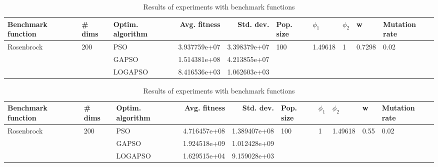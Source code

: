 \documentclass{article}
\begin{document}
\begin{table}
\centering
\caption{Results of experiments with benchmark functions}
\begin{tabular}{lllrrlllll}
\toprule
         Benchmark function &              \# dims & Optim. algorithm &  Avg. fitness &    Std. dev. &            Pop. size &               $\phi_{1}$ &         $\phi_{2}$ &                       w &         Mutation rate \\
\midrule
\multirow{3}{*}{Rosenbrock} & \multirow{3}{*}{200} &              PSO &  3.937759e+07 & 3.398379e+07 & \multirow{3}{*}{100} & \multirow{3}{*}{1.49618} & \multirow{3}{*}{1} & \multirow{3}{*}{0.7298} & \multirow{3}{*}{0.02} \\
                            &                      &            GAPSO &  1.514381e+08 & 4.213855e+07 &                      &                          &                    &                         &                       \\
                            &                      &          LOGAPSO &  8.416536e+03 & 1.062603e+03 &                      &                          &                    &                         &                       \\
\bottomrule
\end{tabular}
\end{table}
\begin{table}
\centering
\caption{Results of experiments with benchmark functions}
\begin{tabular}{lllrrlllll}
\toprule
         Benchmark function &              \# dims & Optim. algorithm &  Avg. fitness &    Std. dev. &            Pop. size &         $\phi_{1}$ &               $\phi_{2}$ &                     w &         Mutation rate \\
\midrule
\multirow{3}{*}{Rosenbrock} & \multirow{3}{*}{200} &              PSO &  4.716457e+08 & 1.389407e+08 & \multirow{3}{*}{100} & \multirow{3}{*}{1} & \multirow{3}{*}{1.49618} & \multirow{3}{*}{0.55} & \multirow{3}{*}{0.02} \\
                            &                      &            GAPSO &  1.924518e+09 & 1.012428e+09 &                      &                    &                          &                       &                       \\
                            &                      &          LOGAPSO &  1.629515e+04 & 9.159028e+03 &                      &                    &                          &                       &                       \\
\bottomrule
\end{tabular}
\end{table}
\end{document}
